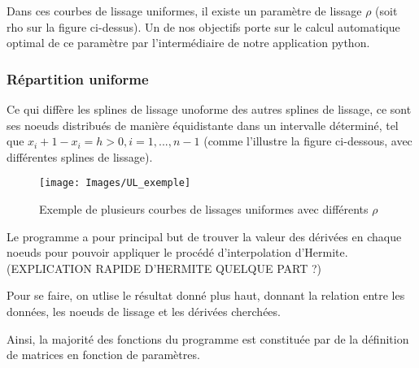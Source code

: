 \documentclass[a4paper,12pt]{article} %
\begin{document}
			 
            Dans ces courbes de lissage uniformes, il existe un paramètre de lissage $\rho$ (soit rho sur la figure ci-dessus). Un de nos objectifs porte sur le calcul automatique optimal de ce paramètre par l'intermédiaire de notre application python.

			\subsubsection{Répartition uniforme}
			
                Ce qui diffère les splines de lissage unoforme des autres splines de lissage, ce sont ses noeuds distribués de manière équidistante dans un intervalle déterminé, tel que $x_i+1 - x_i = h > 0, i = 1,...,n-1$ (comme l'illustre la figure ci-dessous, avec différentes splines de lissage).
                \begin{figure}
                    \centering
                    \texttt{[image: Images/UL\_exemple]}
                    \caption{Exemple de plusieurs courbes de lissages uniformes avec différents  $\rho$  }
                    \label{fig:UL1}
                \end{figure}
                
                Le programme a pour principal but de trouver la valeur des dérivées en chaque noeuds pour pouvoir appliquer le procédé d'interpolation d'Hermite.
                (EXPLICATION RAPIDE D'HERMITE QUELQUE PART ?)

                Pour se faire, on utlise le résultat donné plus haut, donnant la relation entre les données, les noeuds de lissage et les dérivées cherchées.
                
                Ainsi, la majorité des fonctions du programme est constituée par de la définition de matrices en fonction de paramètres.
                
                
            
\end{document}
